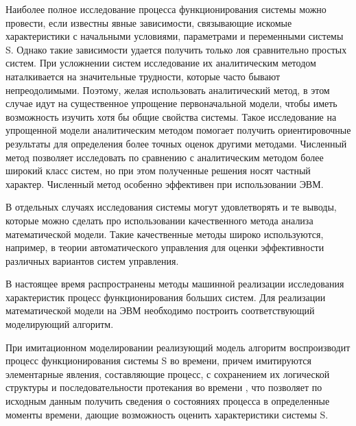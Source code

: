     Наиболее полное исследование процесса функционирования системы можно провести, если известны явные зависимости, связывающие искомые характеристики с начальными условиями, параметрами и переменными системы S. Однако такие зависимости удается получить только лоя сравнительно простых систем. При усложнении систем исследование их аналитическим методом наталкивается на значительные трудности, которые часто бывают непреодолимыми. Поэтому, желая использовать аналитический метод, в этом случае идут на существенное упрощение первоначальной модели, чтобы иметь возможность изучить хотя бы общие свойства системы. Такое исследование на упрощенной модели аналитическим методом помогает получить ориентировочные результаты для определения более точных оценок другими методами. Численный метод позволяет исследовать по сравнению с аналитическим методом более широкий класс систем, но при этом полученные решения носят частный характер. Численный метод особенно эффективен при использовании ЭВМ.

    В отдельных случаях исследования системы могут удовлетворять и те выводы, которые можно сделать про использовании качественного метода анализа математической модели. Такие качественные методы широко используются, например, в теории автоматического управления для оценки эффективности различных вариантов систем управления.

    В настоящее время распространены методы машинной реализации исследования характеристик процесс функционирования больших систем. Для реализации математической модели на ЭВМ необходимо построить соответствующий моделирующий алгоритм.

    При имитационном моделировании реализующий модель алгоритм воспроизводит процесс функционирования системы S во времени, причем имитируются элементарные явления, составляющие процесс, с сохранением их логической структуры и последовательности протекания во времени , что позволяет по исходным данным получить сведения о состояниях процесса в определенные моменты времени, дающие возможность оценить характеристики системы S.

